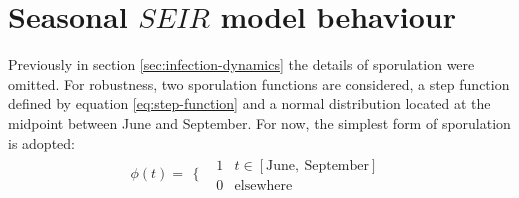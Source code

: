 
\section{Seasonal $SEIR$ model behaviour}

Previously in section \ref{sec:infection-dynamics} the details of sporulation were omitted. For robustness, two sporulation functions are considered, a step function defined by equation \ref{eq:step-function} and a normal distribution located at the midpoint between June and September. For now, the simplest form of sporulation is adopted:
\begin{equation}
\label{eq:step-function}
\phi(t) = 
\begin{array}{cc}
  \{ & 
    \begin{array}{cc}
      1 & t\in [\mathrm{June},\ \mathrm{September}] \\
      0 &  \mathrm{elsewhere}
    \end{array}
\end{array}
\end{equation}

